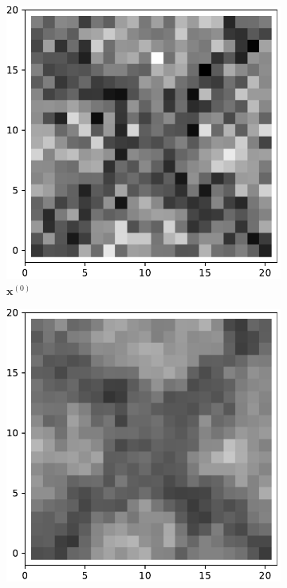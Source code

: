    \begin{figure}[!h]
        \centering
        \begin{subfigure}[b]{0.24\textwidth}
            \centering
            \includegraphics[width=\textwidth]{./img/ximage.pdf}
            \caption[]%
            {{\small $\mathbf{x}^{(0)}$}}    
            \label{fig:ximage2}
        \end{subfigure}
        \begin{subfigure}[b]{0.24\textwidth}  
            \centering 
            \includegraphics[width=\textwidth]{./img/2d1-0.pdf}

\end{subfigure}
\end{figure}
